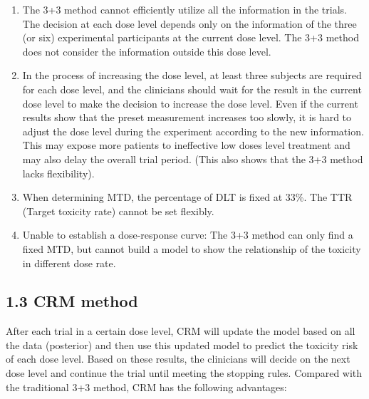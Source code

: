 \documentclass[
]{article}
\begin{document}
\begin{enumerate}
\def\labelenumi{\alph{enumi}.}
\item
  The 3+3 method cannot efficiently utilize all the information in the
  trials. The decision at each dose level depends only on the
  information of the three (or six) experimental participants at the
  current dose level. The 3+3 method does not consider the information
  outside this dose level.
\item
  In the process of increasing the dose level, at least three subjects
  are required for each dose level, and the clinicians should wait for
  the result in the current dose level to make the decision to increase
  the dose level. Even if the current results show that the preset
  measurement increases too slowly, it is hard to adjust the dose level
  during the experiment according to the new information. This may
  expose more patients to ineffective low doses level treatment and may
  also delay the overall trial period. (This also shows that the 3+3
  method lacks flexibility).
\item
  When determining MTD, the percentage of DLT is fixed at 33\%. The TTR
  (Target toxicity rate) cannot be set flexibly.
\item
  Unable to establish a dose-response curve: The 3+3 method can only
  find a fixed MTD, but cannot build a model to show the relationship of
  the toxicity in different dose rate.
\end{enumerate}

\hypertarget{crm-method}{%
\subsection{1.3 CRM method}\label{crm-method}}

After each trial in a certain dose level, CRM will update the model
based on all the data (posterior) and then use this updated model to
predict the toxicity risk of each dose level. Based on these results,
the clinicians will decide on the next dose level and continue the trial
until meeting the stopping rules. Compared with the traditional 3+3
method, CRM has the following advantages:
\end{document}
